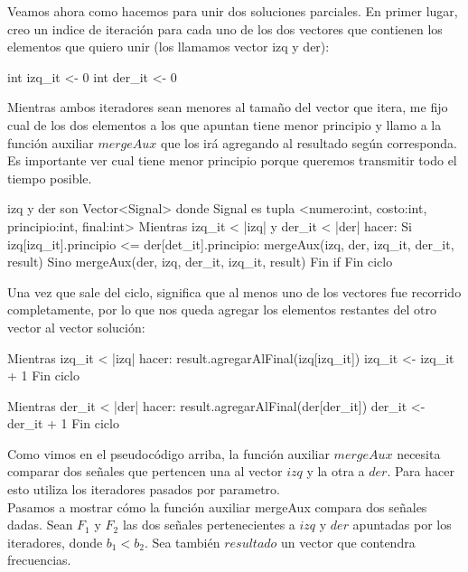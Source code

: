 Veamos ahora como hacemos para unir dos soluciones parciales. En primer lugar, creo un indice de iteración para cada uno de los dos vectores que contienen los elementos que quiero unir (los llamamos vector izq y der):

\begin{codesnippet}
int izq_it <- 0
int der_it <- 0
\end{codesnippet}

Mientras ambos iteradores sean menores al tamaño del vector que itera, me fijo cual de los dos elementos a los que apuntan tiene menor principio y llamo a la función auxiliar $mergeAux$ que los irá agregando al resultado según corresponda. Es importante ver cual tiene menor principio porque queremos transmitir todo el tiempo posible.

\begin{codesnippet}
izq y der son Vector<Signal>
    donde Signal es tupla <numero:int, costo:int, principio:int, final:int>
Mientras izq_it < |izq| y der_it < |der| hacer:
    Si izq[izq_it].principio <= der[det_it].principio:
        mergeAux(izq, der, izq_it, der_it, result)
    Sino
        mergeAux(der, izq, der_it, izq_it, result)
    Fin if
Fin ciclo
\end{codesnippet}

Una vez que sale del ciclo, significa que al menos uno de los vectores fue recorrido completamente, por lo que nos queda agregar los elementos restantes del otro vector al vector solución:

\begin{codesnippet}
Mientras izq_it < |izq| hacer:
    result.agregarAlFinal(izq[izq_it])
    izq_it <- izq_it + 1
Fin ciclo

Mientras der_it < |der| hacer:
    result.agregarAlFinal(der[der_it])
    der_it <- der_it + 1
Fin ciclo
\end{codesnippet}

\vspace{1em}

Como vimos en el pseudocódigo arriba, la función auxiliar $mergeAux$ necesita comparar dos señales que pertencen una al vector $izq$ y la otra a $der$. Para hacer esto utiliza los iteradores pasados por parametro.\\

Pasamos a mostrar cómo la función auxiliar mergeAux compara dos señales dadas. Sean $F_{1}$ y $F_{2}$ las dos señales pertenecientes a $izq$ y $der$ apuntadas por los iteradores,  donde $b_{1} < b_{2}$. Sea también $resultado$ un vector que contendra frecuencias.\\

